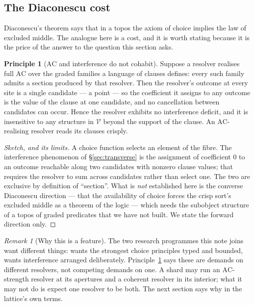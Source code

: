 \documentclass[11pt]{article}
\theoremstyle{definition}
\newtheorem{principle}{Principle}
\theoremstyle{plain}
\theoremstyle{remark}
\newtheorem{remark}{Remark}
\newcommand{\V}{\mathcal{V}}
\newcommand{\AC}{\mathrm{AC}}
\begin{document}
\subsection{The Diaconescu cost}\label{ssec:diaconescu}

Diaconescu's theorem says that in a topos the axiom of choice implies the law of
excluded middle. The analogue here is a cost, and it is worth stating because it is the
price of the answer to the question this section asks.

\begin{principle}[$\AC$ and interference do not cohabit]\label{prin:diaconescu}
Suppose a resolver realises full $\AC$ over the graded families a language of clauses
defines: every such family admits a section produced by that resolver. Then the
resolver's outcome at every site is a single candidate --- a point --- so the
coefficient it assigns to any outcome is the value of the clause at one candidate, and
no cancellation between candidates can occur. Hence the resolver exhibits no
interference deficit, and it is insensitive to any structure in $\V$ beyond the support
of the clause. An $\AC$-realising resolver reads its clauses crisply.
\end{principle}

\begin{proof}[Sketch, and its limits]
A choice function selects an element of the fibre. The interference phenomenon of
\S\ref{sec:transverse} is the assignment of coefficient $0$ to an outcome reachable
along two candidates with nonzero clause values; that requires the resolver to sum
across candidates rather than select one. The two are exclusive by definition of
``section''. What is \emph{not} established here is the converse Diaconescu direction
--- that the availability of choice forces the crisp sort's excluded middle as a
theorem of the logic --- which needs the subobject structure of a topos of graded
predicates that we have not built. We state the forward direction only.
\end{proof}

\begin{remark}[Why this is a feature]
The two research programmes this note joins want different things: \cite{choicesched}
wants the strongest choice principles typed and bounded, \cite{gradedwhere} wants
interference arranged deliberately. Principle~\ref{prin:diaconescu} says these are
demands on different resolvers, not competing demands on one. A shard may run an
$\AC$-strength resolver at its apertures and a coherent resolver in its interior; what
it may not do is expect one resolver to be both. The next section says why in the
lattice's own terms.
\end{remark}
\end{document}
